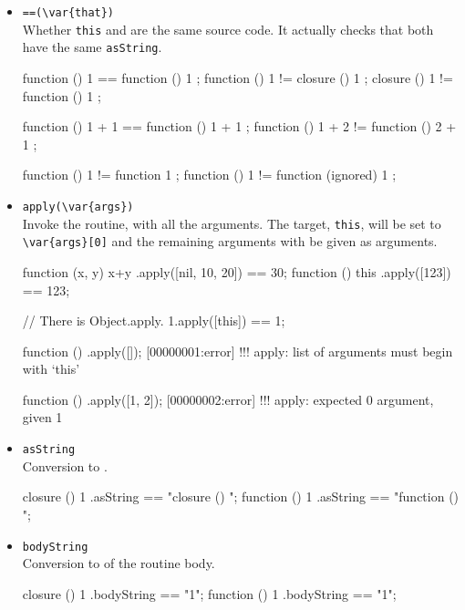 \begin{itemize}
\item \lstinline|==(\var{that})|\\
  Whether \lstinline|this| and  are the same source code.
  It actually checks that both have the same \lstinline|asString|.
\begin{urbiassert}[firstnumber=last]
function () { 1 } == function () { 1 };
function () { 1 } != closure  () { 1 };
closure  () { 1 } != function () { 1 };

function () { 1 + 1 } == function () { 1 + 1 };
function () { 1 + 2 } != function () { 2 + 1 };

function () { 1 } != function { 1 };
function () { 1 } != function (ignored) { 1 };
\end{urbiassert}

\item \lstinline|apply(\var{args})|\\
  Invoke the routine, with all the arguments.  The target,
  \lstinline|this|, will be set to \lstinline|\var{args}[0]| and the
  remaining arguments with be given as arguments.
\begin{urbiassert}[firstnumber=last]
function (x, y) { x+y }.apply([nil, 10, 20]) == 30;
function () { this }.apply([123]) == 123;

// There is Object.apply.
1.apply([this]) == 1;
\end{urbiassert}
\begin{urbiscript}[firstnumber=last]
function () {}.apply([]);
[00000001:error] !!! apply: list of arguments must begin with `this'

function () {}.apply([1, 2]);
[00000002:error] !!! apply: expected 0 argument, given 1
\end{urbiscript}

\item \lstinline|asString|\\
  Conversion to .
\begin{urbiassert}[firstnumber=last]
closure  () { 1 }.asString == "closure () {\n}";
function () { 1 }.asString == "function () {\n}";
\end{urbiassert}

\item \lstinline|bodyString|\\
  Conversion to  of the routine body.
\begin{urbiassert}[firstnumber=last]
closure  () { 1 }.bodyString == "1";
function () { 1 }.bodyString == "1";
\end{urbiassert}

\end{itemize}

